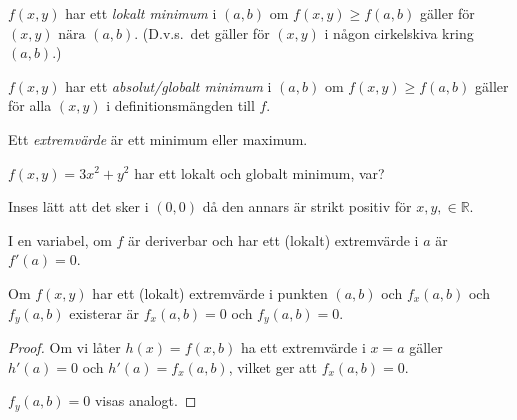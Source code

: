 \documentclass[a4paper]{article}
\begin{document}
\begin{defn}
    \(
        f(x,y) 
    \) har ett \emph{lokalt minimum} i \(
        (a,b)
    \) om \(
        f(x,y) \geq f(a,b)
    \) gäller för \(
        (x,y) \text{ nära } (a,b)
    \). (D.v.s.\ det gäller för \(
        (x,y) 
    \) i någon cirkelskiva kring \(
        (a,b)
    \).)
\end{defn}

\begin{defn}
    \(
        f(x,y) 
    \) har ett \emph{absolut/globalt minimum} i \(
        (a,b)
    \) om \(
        f(x,y) \geq f(a,b)
    \) gäller för alla \(
        (x,y)
    \) i definitionsmängden till \(
        f
    \). 
\end{defn}

\begin{defn}[Extremvärde]
    Ett \emph{extremvärde} är ett minimum eller maximum.
\end{defn}

\begin{ex}
    \(
        f(x,y) = 3x^2+y^2
    \) har ett lokalt och globalt minimum, var?

    Inses lätt att det sker i \(
        (0,0)
    \) då den annars är strikt positiv för \(
        x, y, \in \mathbb{R}
    \).
\end{ex}

\begin{påm}
    I en variabel, om \(
        f
    \) är deriverbar och har ett (lokalt) extremvärde i \(
        a
    \) är \(
        f'(a) = 0
    \).
\end{påm}

\begin{sats}
    Om \(
        f(x,y)
    \) har ett (lokalt) extremvärde i punkten \(
        (a,b)
    \) och \(
        f_x(a,b)
    \) och \(
        f_y(a,b)
    \) existerar är \(
        f_x(a,b) = 0
    \) och \(
        f_y(a,b) = 0
    \).

    \begin{proof}
        Om vi låter \(
            h(x) = f(x,b)
        \) ha ett extremvärde i \(
            x=a
        \) gäller \(
            h'(a) = 0
        \) och \(
            h'(a) = f_x(a,b) 
        \), vilket ger att \(
            f_x(a,b) = 0
        \).

        \(
            f_y(a,b) = 0
        \) visas analogt.
    \end{proof}
\end{sats}
\end{document}
